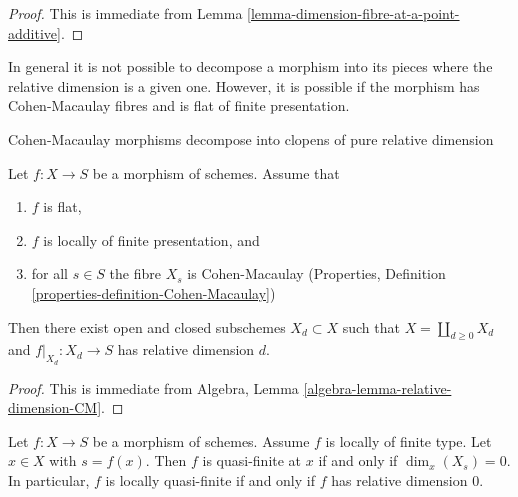 \begin{proof}
This is immediate from Lemma \ref{lemma-dimension-fibre-at-a-point-additive}.
\end{proof}

\noindent
In general it is not possible to decompose a morphism
into its pieces where the relative dimension is a given
one. However, it is possible if the morphism has Cohen-Macaulay
fibres and is flat of finite presentation.

\begin{lemma}
\label{lemma-flat-finite-presentation-CM-fibres-relative-dimension}
\begin{slogan}
Cohen-Macaulay morphisms decompose into clopens of pure relative dimension
\end{slogan}
Let $f : X \to S$ be a morphism of schemes.
Assume that
\begin{enumerate}
\item $f$ is flat,
\item $f$ is locally of finite presentation, and
\item for all $s \in S$ the fibre $X_s$ is Cohen-Macaulay
(Properties, Definition \ref{properties-definition-Cohen-Macaulay})
\end{enumerate}
Then there exist open and closed subschemes $X_d \subset X$
such that $X = \coprod_{d \geq 0} X_d$ and $f|_{X_d} : X_d \to S$
has relative dimension $d$.
\end{lemma}

\begin{proof}
This is immediate from
Algebra, Lemma
\ref{algebra-lemma-relative-dimension-CM}.
\end{proof}

\begin{lemma}
\label{lemma-locally-quasi-finite-rel-dimension-0}
Let $f : X \to S$ be a morphism of schemes.
Assume $f$ is locally of finite type.
Let $x \in X$ with $s = f(x)$.
Then $f$ is quasi-finite at $x$ if and only if $\dim_x(X_s) = 0$.
In particular, $f$ is locally quasi-finite if and only if $f$ has relative
dimension $0$.
\end{lemma}

